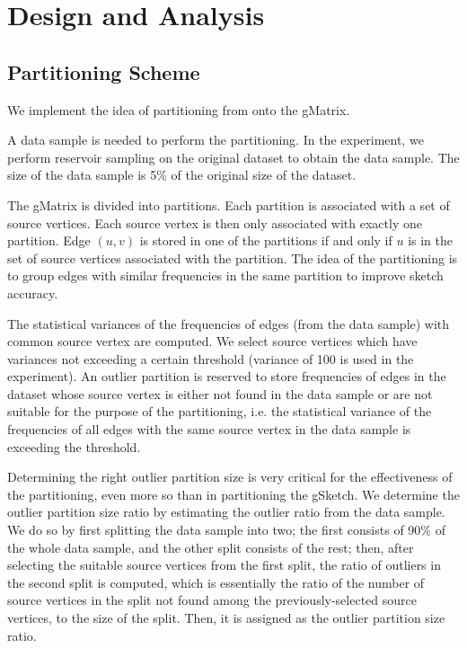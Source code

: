 
\chapter{Design and Analysis}

\ifpdf
    \graphicspath{{Chapter2/Figs/Raster/}{Chapter2/Figs/PDF/}{Chapter2/Figs/}}
\else
    \graphicspath{{Chapter2/Figs/Vector/}{Chapter2/Figs/}}
\fi


\section{Partitioning Scheme}

We implement the idea of partitioning from \cite{DBLP} onto the gMatrix.

A data sample is needed to perform the partitioning. In the experiment, we perform reservoir sampling on the original dataset to obtain the data sample. The size of the data sample is 5\% of the original size of the dataset.

The gMatrix is divided into partitions. Each partition is associated with a set of source vertices. Each source vertex is then only associated with exactly one partition. Edge $(u,v)$ is stored in one of the partitions if and only if $u$ is in the set of source vertices associated with the partition. The idea of the partitioning is to group edges with similar frequencies in the same partition to improve sketch accuracy.

The statistical variances of the frequencies of edges (from the data sample) with common source vertex are computed. We select source vertices which have variances not exceeding a certain threshold (variance of 100 is used in the experiment). An outlier partition is reserved to store frequencies of edges in the dataset whose source vertex is either not found in the data sample or are not suitable for the purpose of the partitioning, i.e. the statistical variance of the frequencies of all edges with the same source vertex in the data sample is exceeding the threshold.

Determining the right outlier partition size is very critical for the effectiveness of the partitioning, even more so than in partitioning the gSketch\cite{DBLP}. We determine the outlier partition size ratio by estimating the outlier ratio from the data sample. We do so by first splitting the data sample into two; the first consists of 90\% of the whole data sample, and the other split consists of the rest; then, after selecting the suitable source vertices from the first split, the ratio of outliers in the second split is computed, which is essentially the ratio of the number of source vertices in the split not found among the previously-selected source vertices, to the size of the split. Then, it is assigned as the outlier partition size ratio.

